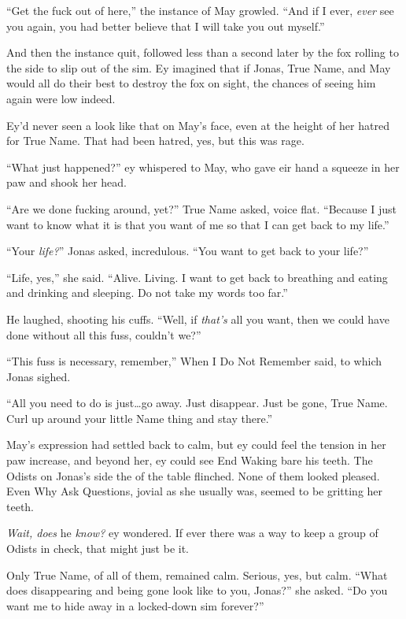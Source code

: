 ``Get the fuck out of here,'' the instance of May growled. ``And if I ever, \emph{ever} see you again, you had better believe that I will take you out myself.''

And then the instance quit, followed less than a second later by the fox rolling to the side to slip out of the sim. Ey imagined that if Jonas, True Name, and May would all do their best to destroy the fox on sight, the chances of seeing him again were low indeed.

Ey'd never seen a look like that on May's face, even at the height of her hatred for True Name. That had been hatred, yes, but this was rage.

``What just happened?'' ey whispered to May, who gave eir hand a squeeze in her paw and shook her head.

``Are we done fucking around, yet?'' True Name asked, voice flat. ``Because I just want to know what it is that you want of me so that I can get back to my life.''

``Your \emph{life?}'' Jonas asked, incredulous. ``You want to get back to your life?''

``Life, yes,'' she said. ``Alive. Living. I want to get back to breathing and eating and drinking and sleeping. Do not take my words too far.''

He laughed, shooting his cuffs. ``Well, if \emph{that's} all you want, then we could have done without all this fuss, couldn't we?''

``This fuss is necessary, remember,'' When I Do Not Remember said, to which Jonas sighed.

``All you need to do is just\ldots go away. Just disappear. Just be gone, True Name. Curl up around your little Name thing and stay there.''

May's expression had settled back to calm, but ey could feel the tension in her paw increase, and beyond her, ey could see End Waking bare his teeth. The Odists on Jonas's side the of the table flinched. None of them looked pleased. Even Why Ask Questions, jovial as she usually was, seemed to be gritting her teeth.

\emph{Wait, does} he \emph{know?} ey wondered. If ever there was a way to keep a group of Odists in check, that might just be it.

Only True Name, of all of them, remained calm. Serious, yes, but calm. ``What does disappearing and being gone look like to you, Jonas?'' she asked. ``Do you want me to hide away in a locked-down sim forever?''

